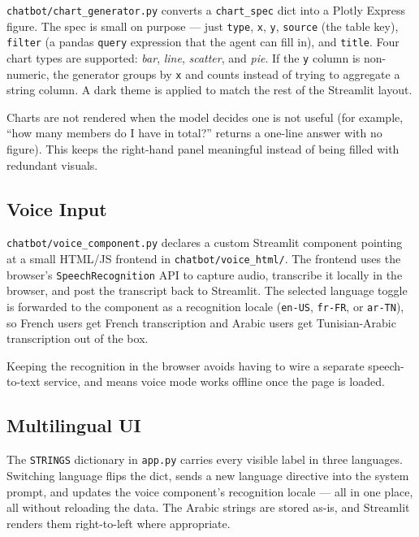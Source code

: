 \texttt{chatbot/chart\_generator.py} converts a \texttt{chart\_spec} dict
into a Plotly Express figure. The spec is small on purpose --- just
\texttt{type}, \texttt{x}, \texttt{y}, \texttt{source} (the table key),
\texttt{filter} (a pandas \texttt{query} expression that the agent can
fill in), and \texttt{title}. Four chart types are supported:
\textit{bar}, \textit{line}, \textit{scatter}, and \textit{pie}. If the
\texttt{y} column is non-numeric, the generator groups by \texttt{x} and
counts instead of trying to aggregate a string column. A dark theme is
applied to match the rest of the Streamlit layout.

Charts are not rendered when the model decides one is not useful (for
example, ``how many members do I have in total?'' returns a one-line
answer with no figure). This keeps the right-hand panel meaningful
instead of being filled with redundant visuals.

\subsection{Voice Input}

\texttt{chatbot/voice\_component.py} declares a custom Streamlit
component pointing at a small HTML/JS frontend in
\texttt{chatbot/voice\_html/}. The frontend uses the browser's
\texttt{SpeechRecognition} API to capture audio, transcribe it locally
in the browser, and post the transcript back to Streamlit. The selected
language toggle is forwarded to the component as a recognition locale
(\texttt{en-US}, \texttt{fr-FR}, or \texttt{ar-TN}), so French users
get French transcription and Arabic users get Tunisian-Arabic
transcription out of the box.

Keeping the recognition in the browser avoids having to wire a separate
speech-to-text service, and means voice mode works offline once the page
is loaded.

\subsection{Multilingual UI}

The \texttt{STRINGS} dictionary in \texttt{app.py} carries every visible
label in three languages. Switching language flips the dict, sends a new
language directive into the system prompt, and updates the voice
component's recognition locale --- all in one place, all without
reloading the data. The Arabic strings are stored as-is, and Streamlit
renders them right-to-left where appropriate.

